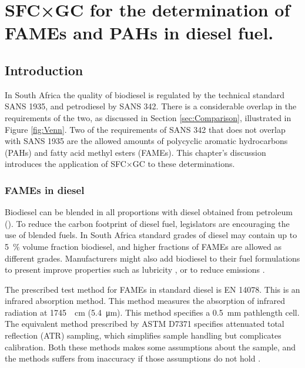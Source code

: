 
\begin{savequote}[\quotewidth]

\end{savequote}

\chapter{SFC×GC for the determination of FAMEs and PAHs in diesel fuel.} %
\label{Chapter7} %

\section{Introduction}

In South Africa the quality of biodiesel is regulated by the technical standard
SANS 1935, and petrodiesel by SANS 342. There is a considerable overlap in the
requirements of the two, as discussed in Section \ref{sec:Comparison},
illustrated in Figure \ref{fig:Venn}. Two of the requirements of SANS 342 that
does not overlap with SANS 1935 are the allowed amounts of polycyclic aromatic
hydrocarbons (PAHs) and fatty acid methyl esters (FAMEs). This chapter's
discussion introduces the application of SFC×GC to these determinations. 

\subsection{FAMEs in diesel}

Biodiesel can be blended in all proportions with diesel obtained from petroleum
(). To reduce the carbon footprint of diesel fuel,
legislators are encouraging the use of blended fuels. In South Africa standard
grades of diesel may contain up to \SI{5}{\percent} volume fraction biodiesel, 
and higher fractions of FAMEs are allowed as different grades. Manufacturers might
also add biodiesel to their fuel formulations to present improve properties such as
lubricity \autocite{Knothe2005}, or to reduce emissions \autocite{Wattrus2016}.

The prescribed test method for FAMEs in standard diesel is EN 14078. This is an
infrared absorption method. This method measures the absorption of infrared
radiation at \SI{1745}{\per\centi\metre} (\SI{5.4}{\micro\metre}). This method
specifies a \SI{0.5}{\milli\metre} pathlength cell. The equivalent method
prescribed by ASTM D7371 specifies attenuated total reflection (ATR) sampling,
which simplifies sample handling but complicates calibration. Both these methods
makes some assumptions about the sample, and the methods suffers from inaccuracy
if those assumptions do not hold \autocite{Pinho2014}.

